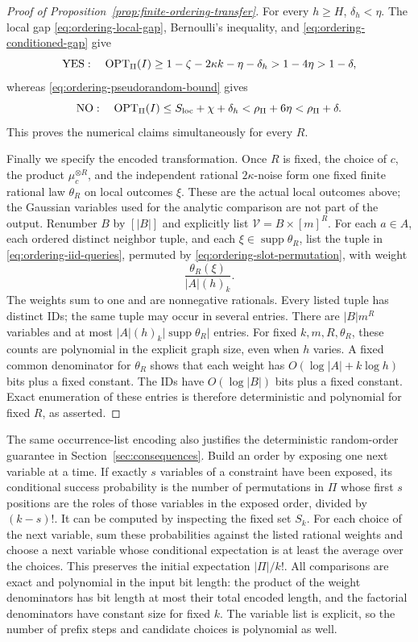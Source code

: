 \begin{proof}[Proof of Proposition~\ref{prop:finite-ordering-transfer}]
For every \(h\ge H\), \(\delta_h<\eta\).  The local gap
\eqref{eq:ordering-local-gap}, Bernoulli's inequality, and
\eqref{eq:ordering-conditioned-gap} give
\[
 \mathrm{YES}:\quad
 \operatorname{OPT}_\Pi(I)\ge1-\zeta-2\kappa k-\eta-\delta_h
 >1-4\eta>1-\delta,
\]
whereas \eqref{eq:ordering-pseudorandom-bound} gives
\[
 \mathrm{NO}:\quad
 \operatorname{OPT}_\Pi(I)\le S_{\mathrm{loc}}+\chi+\delta_h
 <\rho_\Pi+6\eta<\rho_\Pi+\delta.
\]
This proves the numerical claims simultaneously for every \(R\).

Finally we specify the encoded transformation.  Once \(R\) is fixed,
the choice of \(c\), the product \(\mu_c^{\otimes R}\), and the
independent rational \(2\kappa\)-noise form one fixed finite rational
law \(\theta_R\) on local outcomes \(\xi\).  These are the actual
local outcomes above; the Gaussian variables used for the analytic
comparison are not part of the output.  Renumber \(B\) by
\([|B|]\) and explicitly list \(\mathcal V=B\times[m]^R\).
For each \(a\in A\), each ordered
distinct neighbor tuple, and each \(\xi\in\operatorname{supp}\theta_R\),
list the tuple in \eqref{eq:ordering-iid-queries}, permuted by
\eqref{eq:ordering-slot-permutation}, with weight
\begin{equation}
 \frac{\theta_R(\xi)}{|A|(h)_k}.
\label{eq:ordering-rational-weight}
\end{equation}
The weights sum to one and are nonnegative rationals.  Every listed
tuple has distinct IDs; the same tuple may occur in several entries.
There are \(|B|m^R\) variables and at most
\(|A|(h)_k|\operatorname{supp}\theta_R|\) entries.  For fixed
\(k,m,R,\theta_R\), these counts are polynomial in the explicit graph
size, even when \(h\) varies.  A fixed common denominator for
\(\theta_R\) shows that each weight has
\(O(\log|A|+k\log h)\) bits plus a fixed constant.  The IDs have
\(O(\log|B|)\) bits plus a fixed constant.  Exact enumeration of
these entries is therefore deterministic and polynomial for fixed
\(R\), as asserted.
\end{proof}

The same occurrence-list encoding also justifies the deterministic
random-order guarantee in Section~\ref{sec:consequences}.  Build an
order by exposing one next variable at a time.  If exactly \(s\)
variables of a constraint have been exposed, its conditional success
probability is the number of permutations in \(\Pi\) whose first
\(s\) positions are the roles of those variables in the exposed order, divided by
\((k-s)!\).  It can be computed by inspecting the fixed set \(S_k\).
For each choice of the next variable, sum these probabilities against
the listed rational weights and choose a next variable whose conditional
expectation is at least the average over the choices.
This preserves the initial expectation \(|\Pi|/k!\).  All comparisons
are exact and polynomial in the input bit length: the product of the
weight denominators has bit length at most their total encoded length,
and the factorial denominators have constant size for fixed \(k\).
The variable list is explicit, so the number of prefix steps and
candidate choices is polynomial as well.

